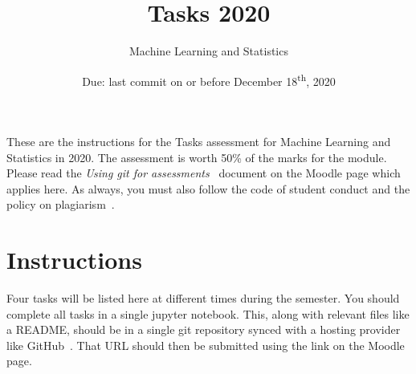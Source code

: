 \documentclass[a4paper, 12pt]{scrartcl}
\title{\vspace{-20mm}Tasks 2020}
\author{Machine Learning and Statistics}
\date{Due: last commit on or before December 18\textsuperscript{th}, 2020\vspace{-6mm}}
\begin{document}
  \maketitle

  These are the instructions for the Tasks assessment for Machine Learning and Statistics in 2020.
  The assessment is worth 50\% of the marks for the module.
  Please read the \emph{Using git for assessments}~\cite{usinggit} document on the Moodle page which applies here.
  As always, you must also follow the code of student conduct and the policy on plagiarism~\cite{gmitqaf}.

  \section*{Instructions}
    Four tasks will be listed here at different times during the semester.
    You should complete all tasks in a single jupyter notebook.
    This, along with relevant files like a README, should be in a single git repository synced with a hosting provider like GitHub~\cite{github}.
    That URL should then be submitted using the link on the Moodle page.
\end{document}
